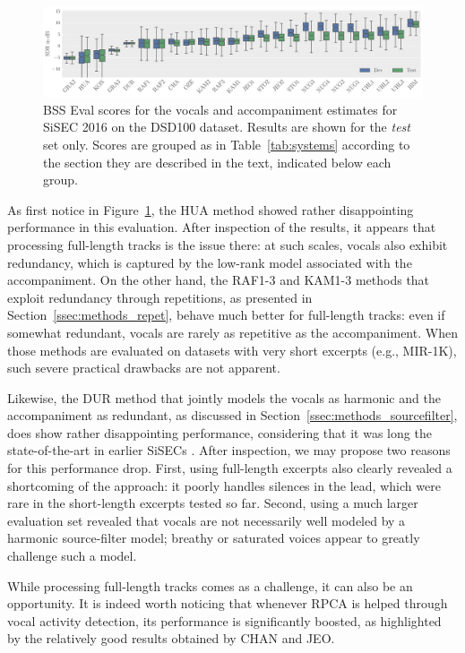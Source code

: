 {{\begin{figure}[htbp]
	\includegraphics[width=\textwidth]{gfx/vocalsSDR.pdf}
	\caption{BSS Eval scores for the vocals and accompaniment estimates for SiSEC 2016 on the DSD100 dataset. Results are  shown for the \emph{test} set only. Scores are grouped as in Table~\ref{tab:systems} according to the section they are described in the text, indicated below each group.}
	\label{fig:eval}
\end{figure}

As first notice in Figure~\ref{fig:eval}, the HUA method showed rather disappointing performance in this evaluation. After inspection of the results, it appears that processing full-length tracks is the issue there: at such scales, vocals also exhibit redundancy, which is captured by the low-rank model associated with the accompaniment. On the other hand, the RAF1-3 and KAM1-3 methods that exploit redundancy through repetitions, as presented in Section~\ref{ssec:methods_repet}, behave much better for full-length tracks: even if somewhat redundant, vocals are rarely as repetitive as the accompaniment. When those methods are evaluated on datasets with very short excerpts (e.g., MIR-1K), such severe practical drawbacks are not apparent.

Likewise, the DUR method that jointly models the vocals as harmonic and the accompaniment as redundant, as discussed in Section~\ref{ssec:methods_sourcefilter}, does show rather disappointing performance, considering that it was long the state-of-the-art in earlier SiSECs \cite{vincent12}. After inspection, we may propose two reasons for this performance drop. First, using full-length excerpts also clearly revealed a shortcoming of the approach: it poorly handles silences in the lead, which were rare in the short-length excerpts tested so far. Second, using a much larger evaluation set revealed that vocals are not necessarily well modeled by a harmonic source-filter model; breathy or saturated voices appear to greatly challenge such a model.

While processing full-length tracks comes as a challenge, it can also be an opportunity. It is indeed worth noticing that whenever RPCA is helped through vocal activity detection, its performance is significantly boosted, as highlighted by the relatively good results obtained by CHAN and JEO.

}}
